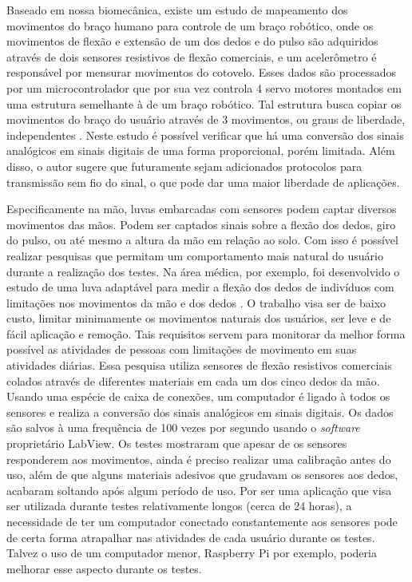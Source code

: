 \documentclass[
	12pt,				%
	openright,			%
	oneside,			%
	a4paper,			%
	english,			%
	brazil				%
	]{abntex2}
\begin{document}
		Baseado em nossa biomecânica, existe um estudo de mapeamento dos movimentos do braço humano para controle de um braço robótico, onde os movimentos de flexão e extensão de um dos dedos e do pulso são adquiridos através de dois sensores resistivos de flexão comerciais, e um acelerômetro é responsável por mensurar movimentos do cotovelo. Esses dados são processados por um microcontrolador que por sua vez controla 4 servo motores montados em uma estrutura semelhante à de um braço robótico. Tal estrutura busca copiar os movimentos do braço do usuário através de 3 movimentos, ou graus de liberdade, independentes \cite{syed2012armcontroller}. Neste estudo é possível verificar que há uma conversão dos sinais analógicos em sinais digitais de uma forma proporcional, porém limitada. Além disso, o autor sugere que futuramente sejam adicionados protocolos para transmissão sem fio do sinal, o que pode dar uma maior liberdade de aplicações.
		
		Especificamente na mão, luvas embarcadas com sensores podem captar diversos movimentos das mãos. Podem ser captados sinais sobre a flexão dos dedos, giro do pulso, ou até mesmo a altura da mão em relação ao solo. Com isso é possível realizar pesquisas que permitam um comportamento mais natural do usuário durante a realização dos testes. Na área médica, por exemplo, foi desenvolvido o estudo de uma luva adaptável para medir a flexão dos dedos de indivíduos com limitações nos movimentos da mão e dos dedos \cite{simone2004lowcost}. O trabalho visa ser de baixo custo, limitar minimamente os movimentos naturais dos usuários, ser leve e de fácil aplicação e remoção. Tais requisitos servem para monitorar da melhor forma possível as atividades de pessoas com limitações de movimento em suas atividades diárias. Essa pesquisa utiliza sensores de flexão resistivos comerciais colados através de diferentes materiais em cada um dos cinco dedos da mão. Usando uma espécie de caixa de conexões, um computador é ligado à todos os sensores e realiza a conversão dos sinais analógicos em sinais digitais. Os dados são salvos à uma frequência de 100 vezes por segundo usando o \textit{software} proprietário LabView. Os testes mostraram que apesar de os sensores responderem aos movimentos, ainda é preciso realizar uma calibração antes do uso, além de que alguns materiais adesivos que grudavam os sensores aos dedos, acabaram soltando após algum período de uso. Por ser uma aplicação que visa ser utilizada durante testes relativamente longos (cerca de 24 horas), a necessidade de ter um computador conectado constantemente aos sensores pode de certa forma atrapalhar nas atividades de cada usuário durante os testes. Talvez o uso de um computador menor, Raspberry Pi por exemplo, poderia melhorar esse aspecto durante os testes.		
		
\end{document}
